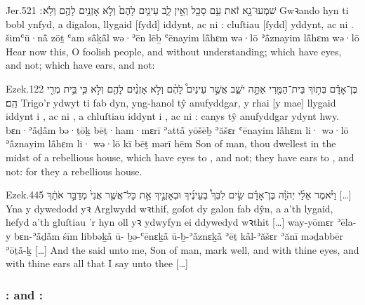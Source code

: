 \begin{example}{Jer.}{5}{21}{}{}
	\quoling
	{שִׁמְעוּ־נָ֣א זֹ֔את עַ֥ם סָכָ֖ל וְאֵ֣ין לֵ֑ב עֵינַ֤יִם לָהֶם֙ וְלֹ֣א  אָזְנַ֥יִם לָהֶ֖ם וְלֹ֥א ׃}
	{Gwꝛando hyn ti bobl ynfyd, a digalon, llygaid [ſydd] iddynt, ac ni : cluſtiau [ſydd] yddynt, ac ni .}
	{šimʿū·nå̄ zōṯ ʿam så̄ḵå̄l wə·ʾēn lēḇ ʿēnayim lå̄hɛm wə·lō  ʾå̄znayim lå̄hɛm wə·lō }
	{Hear now this, O foolish people, and without understanding; which have eyes, and  not; which have ears, and  not:}
\end{example}

\begin{example}{Ezek.}{12}{2}{}{}
	\quoling
	{בֶּן־אָדָ֕ם בְּת֥וֹךְ בֵּית־הַמֶּ֖רִי אַתָּ֣ה יֹשֵׁ֑ב אֲשֶׁ֣ר עֵינַיִם֩ לָהֶ֨ם  וְלֹ֣א  אָזְנַ֨יִם לָהֶ֤ם  וְלֹ֣א  כִּ֛י בֵּ֥ית מְרִ֖י הֵֽם׃}
	{Trigo’r ydwyt ti fab dyn, yng-hanol tŷ anufyddgar, y rhai [y mae] llygaid iddynt i , ac ni , a chluſtiau iddynt i , ac ni : canys tŷ anufyddgar ydynt hwy.}
	{bɛn·ʾå̄ḏå̄m bə·ṯōḵ bēṯ·ham·mɛrī ʾattå̄ yōšēḇ ʾăšɛr ʿēnayim lå̄hɛm li· wə·lō  ʾå̄znayim lå̄hɛm li· wə·lō  kī bēṯ mərī hēm}
	{Son of man, thou dwellest in the midst of a rebellious house, which have eyes to , and  not; they have ears to , and  not: for they  a rebellious house.}
\end{example}

\begin{example}{Ezek.}{44}{5}{}{}
	\quoling
	{וַיֹּ֨אמֶר אֵלַ֜י יְהֹוָ֗ה בֶּן־אָדָ֡ם שִׂ֣ים לִבְּךָ֩  בְעֵינֶ֜יךָ וּבְאָזְנֶ֣יךָ  אֵ֣ת כָּל־אֲשֶׁ֤ר אֲנִי֙ מְדַבֵּ֣ר אֹתָ֔ךְ […]}
	{Yna y dywedodd yꝛ Arglwydd wꝛthif, goſot dy galon fab dŷn, a  a’th lygaid,  hefyd a’th gluſtiau ’r hyn oll yꝛ ydwyfyn ei ddywedyd wꝛthit […]}
	{way-yōmɛr ʾēla-y {\YHWH} bɛn-ʾå̄ḏå̄m śīm libbəḵå̄ ū- ḇə-ʿēnɛḵå̄ ū-ḇ-ʾå̄znɛḵå̄  ʾēṯ kå̄l-ʾăšɛr ʾănī məḏabbēr ʾōṯå̄-ḵ […]}
	{And the {\LORD} said unto me, Son of man, mark well, and  with thine eyes, and  with thine ears all that I say unto thee […]}
\end{example}



\subsubsection{: and :}

